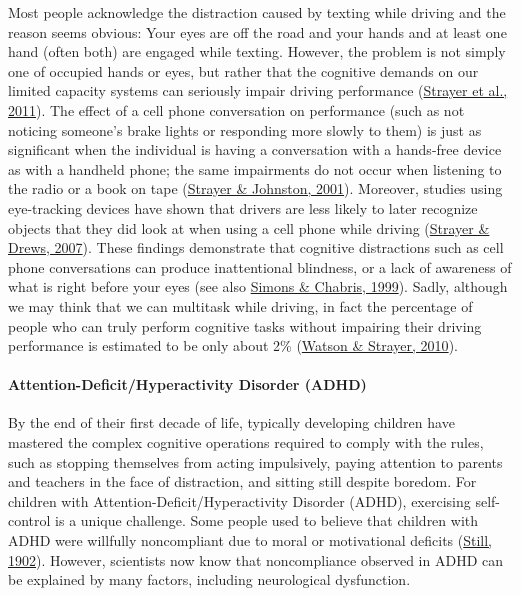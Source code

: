 \documentclass[
]{krantz}
\begin{document}
Most people acknowledge the distraction caused by texting while driving and the reason seems obvious: Your eyes are off the road and your hands and at least one hand (often both) are engaged while texting. However, the problem is not simply one of occupied hands or eyes, but rather that the cognitive demands on our limited capacity systems can seriously impair driving performance (\protect\hyperlink{ref-Strayer2011}{Strayer et al., 2011}). The effect of a cell phone conversation on performance (such as not noticing someone's brake lights or responding more slowly to them) is just as significant when the individual is having a conversation with a hands-free device as with a handheld phone; the same impairments do not occur when listening to the radio or a book on tape (\protect\hyperlink{ref-Strayer2001}{Strayer \& Johnston, 2001}). Moreover, studies using eye-tracking devices have shown that drivers are less likely to later recognize objects that they did look at when using a cell phone while driving (\protect\hyperlink{ref-Strayer2007}{Strayer \& Drews, 2007}). These findings demonstrate that cognitive distractions such as cell phone conversations can produce inattentional blindness, or a lack of awareness of what is right before your eyes (see also \protect\hyperlink{ref-Simons1999}{Simons \& Chabris, 1999}). Sadly, although we may think that we can multitask while driving, in fact the percentage of people who can truly perform cognitive tasks without impairing their driving performance is estimated to be only about 2\% (\protect\hyperlink{ref-Watson2010}{Watson \& Strayer, 2010}).

\hypertarget{attention-deficithyperactivity-disorder-adhd}{%
\paragraph*{Attention-Deficit/Hyperactivity Disorder (ADHD)}\label{attention-deficithyperactivity-disorder-adhd}}

By the end of their first decade of life, typically developing children have mastered the complex cognitive operations required to comply with the rules, such as stopping themselves from acting impulsively, paying attention to parents and teachers in the face of distraction, and sitting still despite boredom. For children with Attention-Deficit/Hyperactivity Disorder (ADHD), exercising self-control is a unique challenge. Some people used to believe that children with ADHD were willfully noncompliant due to moral or motivational deficits (\protect\hyperlink{ref-Still1902}{Still, 1902}). However, scientists now know that noncompliance observed in ADHD can be explained by many factors, including neurological dysfunction.
\end{document}
